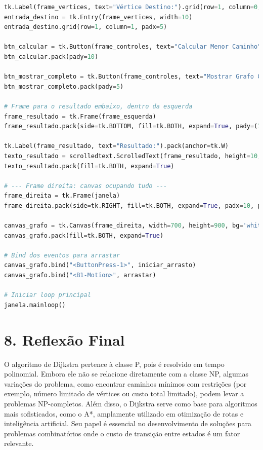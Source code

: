 \documentclass[12pt,a4paper]{report}
\begin{document}
\begin{lstlisting}[language=Python, caption=Dijkstra em Python (parcial)]
tk.Label(frame_vertices, text="Vértice Destino:").grid(row=1, column=0, sticky=tk.W)
entrada_destino = tk.Entry(frame_vertices, width=10)
entrada_destino.grid(row=1, column=1, padx=5)

btn_calcular = tk.Button(frame_controles, text="Calcular Menor Caminho", command=executar_dijkstra)
btn_calcular.pack(pady=10)

btn_mostrar_completo = tk.Button(frame_controles, text="Mostrar Grafo Completo", command=mostrar_grafo_completo)
btn_mostrar_completo.pack(pady=5)

# Frame para o resultado embaixo, dentro da esquerda
frame_resultado = tk.Frame(frame_esquerda)
frame_resultado.pack(side=tk.BOTTOM, fill=tk.BOTH, expand=True, pady=(10,0))

tk.Label(frame_resultado, text="Resultado:").pack(anchor=tk.W)
texto_resultado = scrolledtext.ScrolledText(frame_resultado, height=10, wrap=tk.WORD)
texto_resultado.pack(fill=tk.BOTH, expand=True)

# --- Frame direita: canvas ocupando tudo ---
frame_direita = tk.Frame(janela)
frame_direita.pack(side=tk.RIGHT, fill=tk.BOTH, expand=True, padx=10, pady=10)

canvas_grafo = tk.Canvas(frame_direita, width=700, height=900, bg='white', highlightthickness=1, highlightbackground='black')
canvas_grafo.pack(fill=tk.BOTH, expand=True)

# Bind dos eventos para arrastar
canvas_grafo.bind("<ButtonPress-1>", iniciar_arrasto)
canvas_grafo.bind("<B1-Motion>", arrastar)

# Iniciar loop principal
janela.mainloop()

\end{lstlisting}

\chapter{8. Reflexão Final}

O algoritmo de Dijkstra pertence à classe P, pois é resolvido em tempo polinomial. Embora ele não se relacione diretamente com a classe NP, algumas variações do problema, como encontrar caminhos mínimos com restrições (por exemplo, número limitado de vértices ou custo total limitado), podem levar a problemas NP-completos. Além disso, o Dijkstra serve como base para algoritmos mais sofisticados, como o A*, amplamente utilizado em otimização de rotas e inteligência artificial. Seu papel é essencial no desenvolvimento de soluções para problemas combinatórios onde o custo de transição entre estados é um fator relevante.
\end{document}
